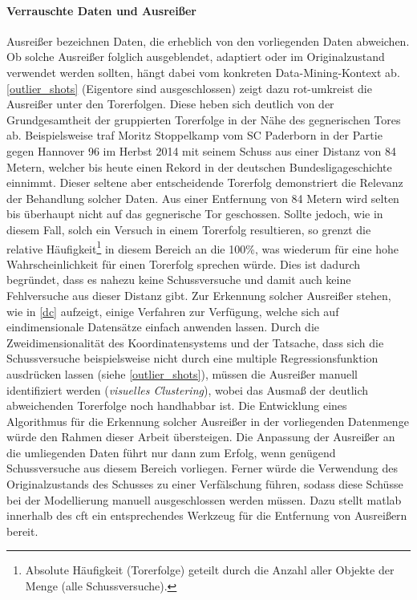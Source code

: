 \paragraph{Verrauschte Daten und Ausreißer}
Ausreißer bezeichnen Daten, die erheblich von den vorliegenden Daten abweichen. Ob solche Ausreißer folglich ausgeblendet, adaptiert oder im Originalzustand verwendet werden sollten, hängt dabei vom konkreten Data-Mining-Kontext ab. \vref{outlier_shots} (Eigentore sind ausgeschlossen) zeigt dazu rot-umkreist die Ausreißer unter den Torerfolgen. Diese 	 heben sich deutlich von der Grundgesamtheit der gruppierten Torerfolge in der Nähe des gegnerischen Tores ab. Beispielsweise traf Moritz Stoppelkamp vom SC Paderborn in der Partie gegen Hannover 96 im Herbst 2014 mit seinem Schuss aus einer Distanz von 84 Metern, welcher bis heute einen Rekord in der deutschen Bundesligageschichte einnimmt. Dieser seltene aber entscheidende Torerfolg demonstriert die Relevanz der Behandlung solcher Daten. Aus einer Entfernung von 84 Metern wird selten bis überhaupt nicht auf das gegnerische Tor geschossen. Sollte jedoch, wie in diesem Fall, solch ein Versuch in einem Torerfolg resultieren, so grenzt die relative Häufigkeit\footnote{Absolute Häufigkeit (Torerfolge) geteilt durch die Anzahl aller Objekte der Menge (alle Schussversuche).} in diesem Bereich an die 100\%, was wiederum für eine hohe Wahrscheinlichkeit für einen Torerfolg sprechen würde. Dies ist dadurch begründet, dass es nahezu keine Schussversuche und damit auch keine Fehlversuche aus dieser Distanz gibt. Zur Erkennung solcher Ausreißer stehen, wie in \vref{dc} aufzeigt, einige Verfahren zur Verfügung, welche sich auf eindimensionale Datensätze einfach anwenden lassen. Durch die Zweidimensionalität des Koordinatensystems und der Tatsache, dass sich die Schussversuche beispielsweise nicht durch eine multiple Regressionsfunktion ausdrücken lassen (siehe \vref{outlier_shots}), müssen die Ausreißer manuell identifiziert werden (\textit{visuelles Clustering}), wobei das Ausmaß der deutlich abweichenden Torerfolge noch handhabbar ist. Die Entwicklung eines Algorithmus für die Erkennung solcher Ausreißer in der vorliegenden Datenmenge würde den Rahmen dieser Arbeit übersteigen. Die Anpassung der Ausreißer an die umliegenden Daten führt nur dann zum Erfolg, wenn genügend Schussversuche aus diesem Bereich vorliegen. Ferner würde die Verwendung des Originalzustands des Schusses zu einer Verfälschung führen, sodass diese Schüsse bei der Modellierung manuell ausgeschlossen werden müssen. Dazu stellt \gls{matlab} innerhalb des \gls{cft} ein entsprechendes Werkzeug für die Entfernung von Ausreißern bereit.

